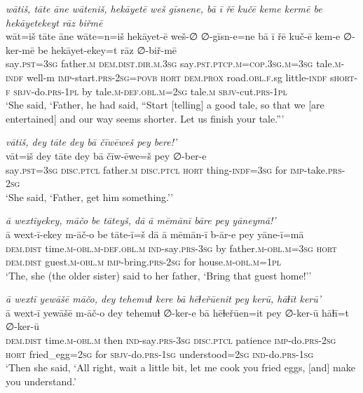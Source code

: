 \ea \label{ŽH.27}
\textit{wātiš, tāte āne wāteniš, hekāyetē weš gīsnene, bā ī řē kučē keme kermē be hekāyetekeyt rāz biřmē} \\ 
\gll wāt=iš tāte āne wāte=n=iš hekāyet-ē weš-∅ ∅-gīsn-e=ne bā ī řē kuč-ē kem-e ∅-ker-mē be hekāyet-ekey=t rāz ∅-biř-mē \\ 
 say\textsc{.pst}\textsc{=3sg} father\textsc{.m} \textsc{dem.dist}\textsc{.dir}\textsc{.m}\textsc{.3sg} say\textsc{.pst}\textsc{.ptcp}\textsc{.m}\textsc{=cop}\textsc{.3sg}\textsc{.m}\textsc{=3sg} tale\textsc{.m}\textsc{-indf} well-m \textsc{imp-}start\textsc{.prs}-\textsc{2sg}\textsc{=\textsc{povb}} \textsc{hort} \textsc{dem.prox} road\textsc{.obl}\textsc{\textsc{.f}}.sg little\textsc{-indf} s\textsc{hort}\textsc{-f} \textsc{sbjv-}do\textsc{.prs}\textsc{-1pl} by tale\textsc{.m}\textsc{-def}\textsc{.obl}\textsc{.m}\textsc{=\textsc{2sg}} tale\textsc{.m} \textsc{sbjv-}cut\textsc{.prs}\textsc{-1pl} \\ 
\glt `She said, ‘Father, he had said, “Start [telling] a good tale, so that we [are entertained] and our way seems shorter. Let us finish your tale.”'
\z 
 
\ea \label{ŽH.38}
\textit{vātiš, dey tāte dey bā čīwēweš pey bere!’} \\ 
\gll vāt=iš dey tāte dey bā čīw-ēwe=š pey ∅-ber-e \\ 
 say\textsc{.pst}\textsc{=3sg} \textsc{disc.ptcl} father\textsc{.m} \textsc{disc.ptcl} \textsc{hort} thing\textsc{-indf}\textsc{=3sg} for \textsc{imp-}take\textsc{.prs}-\textsc{2sg} \\ 
\glt `She said, ‘Father, get him something.’'
\z 
 
\ea \label{ŽH.50}
\textit{ā wextīyekey, māčo be tāteyš, dā ā mēmānī bāre pey yāneymā!’} \\ 
\gll ā wext-ī-ekey m-āč-o be tāte-ī=š dā ā mēmān-ī b-ār-e pey yāne-ī=mā \\ 
 \textsc{dem.dist} time\textsc{.m}\textsc{-obl}\textsc{.m}\textsc{-def}\textsc{.obl}\textsc{.m} \textsc{ind-}say\textsc{.prs}\textsc{-3sg} by father\textsc{.m}\textsc{-obl}\textsc{.m}\textsc{=3sg} \textsc{hort} \textsc{dem.dist} guest\textsc{.m}\textsc{-obl}\textsc{.m} \textsc{imp-}bring\textsc{.prs}-\textsc{2sg} for house\textsc{.m}\textsc{-obl}\textsc{.m}\textsc{=1pl} \\ 
\glt `The, she (the older sister) said to her father, ‘Bring that guest home!’'
\z 
 
\ea \label{ŽH.79}
\textit{ā wextī yewāšē māčo, dey tehemuɫ kere bā hēɫeřūenit pey kerū, hāɫīt kerū'} \\ 
\gll ā wext-ī yewāšē m-āč-o dey tehemuɫ ∅-ker-e bā hēɫeřūen=it pey ∅-ker-ū hāɫī=t ∅-ker-ū \\ 
 \textsc{dem.dist} time\textsc{.m}\textsc{-obl}\textsc{.m} then \textsc{ind-}say\textsc{.prs}\textsc{-3sg} \textsc{disc.ptcl} patience \textsc{imp-}do\textsc{.prs}-\textsc{2sg} \textsc{hort} fried\_egg\textsc{=\textsc{2sg}} for \textsc{sbjv-}do\textsc{.prs}\textsc{-1sg} understood\textsc{=\textsc{2sg}} \textsc{ind-}do\textsc{.prs}\textsc{-1sg} \\ 
\glt `Then she said, ‘All right, wait a little bit, let me cook you fried eggs, [and] make you understand.'
\z 
 
